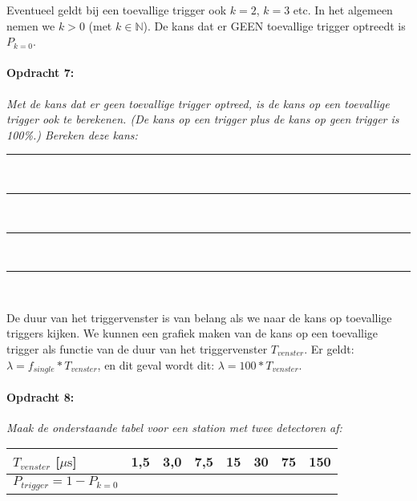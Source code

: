 \bigskip{}

Eventueel geldt bij een toevallige trigger ook $k=2$, $k=3$ etc.
In het algemeen nemen we $k>0$ (met $k\mathbb{\in N}$). De kans
dat er GEEN toevallige trigger optreedt is $P_{k=0}$.

\begin{minipage}[t]{1\columnwidth}%

\paragraph{Opdracht 7:}

\textit{Met de kans dat er geen toevallige trigger optreed, is de
kans op een toevallige trigger ook te berekenen. (De kans op een trigger
plus de kans op geen trigger is 100\%.) Bereken deze kans:}

\begin{center}
    \rule{\textwidth}{0.3mm}\\
    \rule{\textwidth}{0.3mm}\\
    \rule{\textwidth}{0.3mm}\\
    \rule{\textwidth}{0.3mm}\\
\end{center}
\end{minipage}

\bigskip{}

De duur van het triggervenster is van belang als we naar de kans op
toevallige triggers kijken. We kunnen een grafiek maken van de kans
op een toevallige trigger als functie van de duur van het triggervenster
$T_{venster}$. Er geldt: $\lambda=f_{single}*T_{venster}$, en dit
geval wordt dit: $\lambda=100*T_{venster}$$ $. 

\begin{minipage}[t]{1\columnwidth}%

\paragraph{Opdracht 8:}

\textit{Maak de onderstaande tabel voor een station met twee detectoren
af:}

\bigskip{}


\begin{tabular}{|x{.20\textwidth}|x{.07\textwidth}|x{.07\textwidth}
                |x{.07\textwidth}|x{.07\textwidth}|x{.07\textwidth}
                |x{.07\textwidth}|x{.07\textwidth}|}
\hline 
$T_{venster}$ {[}$\mu\mathrm{s}${]} & 1,5 & 3,0 & 7,5 & 15 & 30 & 75 & 150\tabularnewline
\hline 
$P_{trigger}=1-P_{k=0}$ &  &  &  &  &  &  & \tabularnewline
\hline 
\end{tabular}%
\end{minipage}

